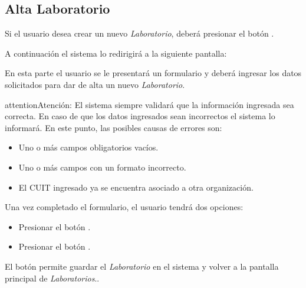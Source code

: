 \documentclass[a4paper,10pt,spanish]{sphinxmanual}
\begin{document}
\subsection{Alta Laboratorio}
\label{laboratorios:alta-laboratorio}\label{laboratorios:id1}
Si el usuario desea crear un nuevo \emph{Laboratorio}, deberá presionar el botón .


A continuación el sistema lo redirigirá a la siguiente pantalla:


En esta parte el usuario se le presentará un formulario y deberá ingresar los datos solicitados para dar de alta un nuevo \emph{Laboratorio}.

\begin{notice}{attention}{Atención:}
El sistema siempre validará que la información ingresada sea correcta. En caso de que los datos ingresados sean incorrectos el sistema lo informará.
En este punto, las posibles causas de errores son:
\begin{itemize}
\item {} 
Uno o más campos obligatorios vacíos.

\item {} 
Uno o más campos con un formato incorrecto.

\item {} 
El CUIT ingresado ya se encuentra asociado a otra organización.

\end{itemize}
\end{notice}

Una vez completado el formulario, el usuario tendrá dos opciones:
\begin{itemize}
\item {} 
Presionar el botón .

\item {} 
Presionar el botón .

\end{itemize}

El botón  permite guardar el \emph{Laboratorio} en el sistema y volver a la pantalla
principal de \emph{Laboratorios}..
\end{document}
